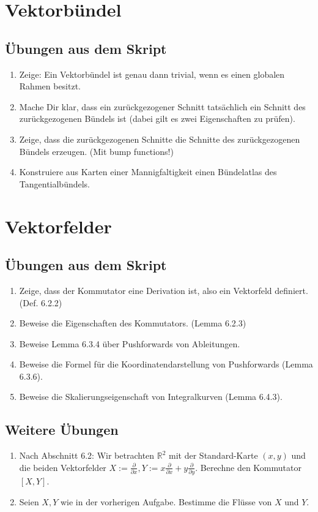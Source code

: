 \documentclass[a4paper]{scrartcl}
\newcommand{\R}{\mathbb{R}}
\begin{document}
	\section{Vektorbündel}
	\subsection{Übungen aus dem Skript}
	\begin{enumerate}
		\item Zeige: Ein Vektorbündel ist genau dann trivial, wenn es einen globalen Rahmen besitzt.
		\item Mache Dir klar, dass ein zurückgezogener Schnitt tatsächlich ein Schnitt des zurückgezogenen Bündels ist (dabei gilt es zwei Eigenschaften zu prüfen).
		\item Zeige, dass die zurückgezogenen Schnitte die Schnitte des zurückgezogenen Bündels erzeugen. (Mit bump functions!)
		\item Konstruiere aus Karten einer Mannigfaltigkeit einen Bündelatlas des Tangentialbündels.
	\end{enumerate}

	\section{Vektorfelder}
	\subsection{Übungen aus dem Skript}
	\begin{enumerate}
		\item Zeige, dass der Kommutator eine Derivation ist, also ein Vektorfeld definiert. (Def. 6.2.2)
		\item Beweise die Eigenschaften des Kommutators. (Lemma 6.2.3)
		\item Beweise Lemma 6.3.4 über Pushforwards von Ableitungen.
		\item Beweise die Formel für die Koordinatendarstellung von Pushforwards (Lemma 6.3.6).
		\item Beweise die Skalierungseigenschaft von Integralkurven (Lemma 6.4.3).
	\end{enumerate}
	\subsection{Weitere Übungen}
	\begin{enumerate}
		\item Nach Abschnitt 6.2: Wir betrachten $\R^2$ mit der Standard-Karte $(x,y)$ und die beiden Vektorfelder $X := \frac{\partial}{\partial x}, Y := x \frac{\partial}{\partial x} + y \frac{\partial}{\partial y}$. Berechne den Kommutator $[X,Y]$.
		\item Seien $X,Y$ wie in der vorherigen Aufgabe. Bestimme die Flüsse von $X$ und $Y$.
	\end{enumerate}
\end{document}
